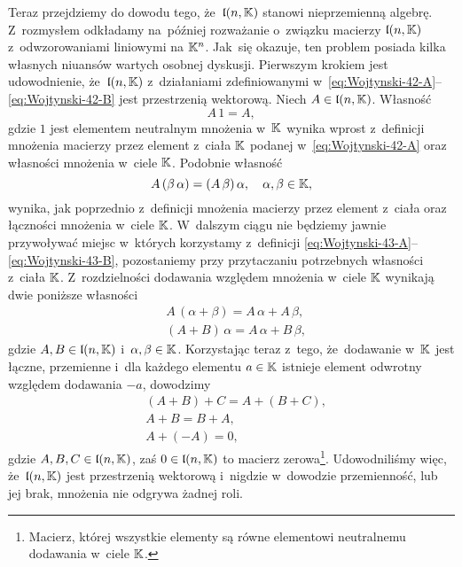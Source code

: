 \documentclass[a4paper,11pt]{article}
\begin{document}
Teraz przejdziemy do dowodu tego, że~$\mathfrak{l}( n, \mathbb{K} )$ stanowi
nieprzemienną algebrę. Z~rozmysłem odkładamy na~później rozważanie
o~związku macierzy $\mathfrak{l}( n, \mathbb{K} )$ z~odwzorowaniami liniowymi na
$\mathbb{K}^{ n }$. Jak~się okazuje, ten problem posiada kilka własnych niuansów
wartych osobnej dyskusji. Pierwszym krokiem jest udowodnienie,
że~$\mathfrak{l}( n, \mathbb{K} )$ z~działaniami zdefiniowanymi
w~\eqref{eq:Wojtynski-42-A}--\eqref{eq:Wojtynski-42-B} jest przestrzenią
wektorową. Niech $A \in \mathfrak{l}( n, \mathbb{K} )$. Własność
\begin{equation}
  \label{eq:Wojtynski-46}
  A \, 1 = A,
\end{equation}
gdzie $1$ jest elementem neutralnym mnożenia w~$\mathbb{K}$ wynika wprost
z~definicji mnożenia macierzy przez element z~ciała $\mathbb{K}$ podanej
w~\eqref{eq:Wojtynski-42-A} oraz własności mnożenia w~ciele $\mathbb{K}$.
Podobnie własność
\begin{equation}
  \label{eq:Wojtynski-47}
  A \, ( \beta \, \alpha ) = ( A \, \beta ) \, \alpha, \quad \alpha, \beta \in \mathbb{K},
\end{equation}
wynika, jak poprzednio z~definicji mnożenia macierzy przez element z~ciała
oraz łączności mnożenia w~ciele $\mathbb{K}$. W~dalszym ciągu nie będziemy jawnie
przywoływać miejsc w~których korzystamy z~definicji
\eqref{eq:Wojtynski-43-A}--\eqref{eq:Wojtynski-43-B}, pozostaniemy przy
przytaczaniu potrzebnych własności z~ciała $\mathbb{K}$. Z~rozdzielności dodawania
względem mnożenia w~ciele $\mathbb{K}$ wynikają dwie poniższe własności
\begin{subequations}
  \begin{align}
    \label{eq:Wojtynski-48-A}
    &A \, ( \alpha + \beta ) = A \, \alpha + A \, \beta, \\
    \label{eq:Wojtynski-48-B}
    &( A + B ) \, \alpha = A \, \alpha + B \, \beta,
  \end{align}
\end{subequations}
gdzie $A, B \in \mathfrak{l}( n, \mathbb{K} )$ i~$\alpha, \beta \in \mathbb{K}$. Korzystając teraz
z~tego, że~dodawanie w~$\mathbb{K}$ jest łączne, przemienne i~dla każdego
elementu $a \in \mathbb{K}$ istnieje element odwrotny względem dodawania $-a$,
dowodzimy
\begin{subequations}
  \begin{align}
    \label{eq:Wojtynski-49-A}
    &( A + B ) + C = A + ( B + C ), \\
    \label{eq:Wojtynski-49-B}
    &A + B = B + A, \\
    \label{eq:Wojtynski-49-C}
    &A + ( -A ) = 0,
  \end{align}
\end{subequations}
gdzie $A, B, C \in \mathfrak{l}( n, \mathbb{K} )$, zaś $0 \in \mathfrak{l}( n, \mathbb{K} )$ to
macierz zerowa\footnote{Macierz, której wszystkie elementy są równe
  elementowi neutralnemu dodawania w~ciele $\mathbb{K}$.}. Udowodniliśmy więc,
że~$\mathfrak{l}( n, \mathbb{K} )$ jest przestrzenią wektorową i~nigdzie w~dowodzie
przemienność, lub jej brak, mnożenia nie odgrywa żadnej roli.
\end{document}

